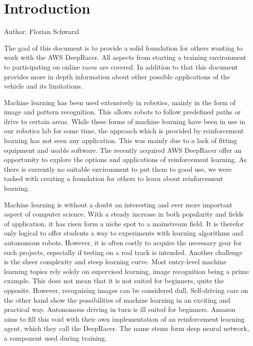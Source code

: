 \chapter{Introduction}\label{cha:Introduction}
Author: Florian Schwarzl

The goal of this document is to provide a solid foundation for others wanting to work with the AWS DeepRacer. All aspects from starting a training environment to participating on online races are covered. In addition to that this document provides more in depth information about other possible applications of the vehicle and its limitations.


Machine learning has been used extensively in robotics, mainly in the form of image and pattern recognition. This allows robots to follow predefined paths or drive to certain areas. While these forms of machine learning have been in use in our robotics lab for some time, the approach which is provided by reinforcement learning has not seen any application. This was mainly due to a lack of fitting equipment and usable software. The recently acquired AWS DeepRacer offer an opportunity to explore the options and applications of reinforcement learning. As there is currently no suitable environment to put them to good use, we were tasked with creating a foundation for others to learn about reinforcement learning. 

Machine learning is without a doubt an interesting and ever more important aspect of computer science. With a steady increase in both popularity and fields of application, it has risen form a niche spot to a mainstream field. It is therefor only logical to offer students a way to experiments with learning algorithms and autonomous robots. However, it is often costly to acquire the necessary gear for such projects, especially if testing on a real track is intended. Another challenge is the sheer complexity and steep learning curve. Most entry-level machine learning topics rely solely on supervised learning, image recognition being a prime example. This does not mean that it is not suited for beginners, quite the opposite. However, recognising images can be considered dull. Self-driving cars on the other hand show the possibilities of machine learning in an exciting and practical way. Autonomous driving in turn is ill suited for beginners. Amazon aims to fill this void with their own implementation of an reinforcement learning agent, which they call the DeepRacer. The name stems form deep neural network, a component used during training.